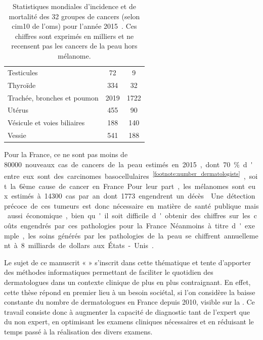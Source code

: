 \begin{table}[H]
\begin{tabular}{lSS}
        Testicules                              & 72                            & 9                         \\
        Thyroïde                                & 334                           & 32                        \\
        Trachée, bronches et poumon             & 2019                          & 1722                      \\
        Utérus                                  & 455                           & 90                        \\
        Vésicule et voies biliaires             & 188                           & 140                       \\
        Vessie                                  & 541                           & 188                       \\ \bottomrule
    \end{tabular}
    \caption{Statistiques mondiales d’incidence et de mortalité des 32 groupes de cancers (selon \gls{cim10} de l'\gls{oms}) pour l'année 2015~\cite{Fitzmaurice2017}. Ces chiffres sont exprimés en milliers et ne recensent pas les cancers de la peau hors mélanome.}
    \label{tab:introduction_cancer_incidence}
\end{table}

Pour la France, ce ne sont pas moins de \SI{80000} nouveaux cas de cancers de la peau estimés en 2015, dont 70~\% d'entre eux sont des carcinomes basocellulaires~\textsuperscript{\ref{footnote:number_dermatologists}}, soit la 6ème cause de cancer en France. Pour leur part, les mélanomes sont eux estimés à \SI{14300} cas par an dont \SI{1773} engendrent un décès~\cite{Thuret2012}. Une détection précoce de ces tumeurs est donc nécessaire en matière de santé publique mais aussi économique, bien qu'il soit difficile d'obtenir des chiffres sur les coûts engendrés par ces pathologies pour la France. Néanmoins à titre d'exemple, les soins générés par les pathologies de la peau se chiffrent annuellement à 8 milliards de dollars aux États-Unis~\cite{Farberg2017a}.\par

\addtocounter{footnote}{1}

Le sujet de ce manuscrit « \titleref » s’inscrit dans cette thématique et tente d’apporter des méthodes informatiques permettant de faciliter le quotidien des dermatologues dans un contexte clinique de plus en plus contraignant. En effet, cette thèse répond en premier lieu à un besoin sociétal, si l'on considère la baisse constante du nombre de dermatologues en France depuis 2010, visible sur la . Ce travail consiste donc à augmenter la capacité de diagnostic tant de l'expert que du non expert, en optimisant les examens cliniques nécessaires et en réduisant le temps passé à la réalisation des divers examens.\par

